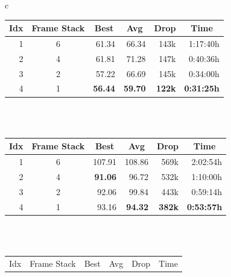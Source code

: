 \begin{table}[htp]
    \begin{center}
        \begin{tabular}{c}
            \begin{tabular}{rcrrrr}
                \toprule
                \multicolumn{1}{c}{Idx} & \multicolumn{1}{c}{Frame Stack} & \multicolumn{1}{c}{Best} & \multicolumn{1}{c}{Avg} & \multicolumn{1}{c}{Drop} & \multicolumn{1}{c}{Time}\\
                \midrule
                1 & 6 & 61.34 & 66.34 & 143k & 1:17:40h \\
                2 & 4 & 61.81 & 71.28 & 147k & 0:40:36h \\
                3 & 2 & 57.22 & 66.69 & 145k & 0:34:00h \\
                4 & 1 & \textbf{56.44} & \textbf{59.70} & \textbf{122k} & \textbf{0:31:25h} \\
                \bottomrule
            \end{tabular} \\
             \\
            \addlinespace[0.5cm]
            \begin{tabular}{rcrrrr}
                \toprule
                \multicolumn{1}{c}{Idx} & \multicolumn{1}{c}{Frame Stack} & \multicolumn{1}{c}{Best} & \multicolumn{1}{c}{Avg} & \multicolumn{1}{c}{Drop} & \multicolumn{1}{c}{Time}\\
                \midrule
                1 & 6 & 107.91 & 108.86 & 569k & 2:02:54h \\
                2 & 4 & \textbf{91.06} & 96.72 & 532k & 1:10:00h \\
                3 & 2 & 92.06 & 99.84 & 443k & 0:59:14h \\
                4 & 1 & 93.16 & \textbf{94.32} & \textbf{382k} & \textbf{0:53:57h} \\
                \bottomrule
            \end{tabular} \\
             \\
            \addlinespace[0.5cm]
            \begin{tabular}{rcrrrr}
                \toprule
                \multicolumn{1}{c}{Idx} & \multicolumn{1}{c}{Frame Stack} & \multicolumn{1}{c}{Best} & \multicolumn{1}{c}{Avg} & \multicolumn{1}{c}{Drop} & \multicolumn{1}{c}{Time}\\

\end{tabular}
\end{tabular}
\end{center}
\end{table}
